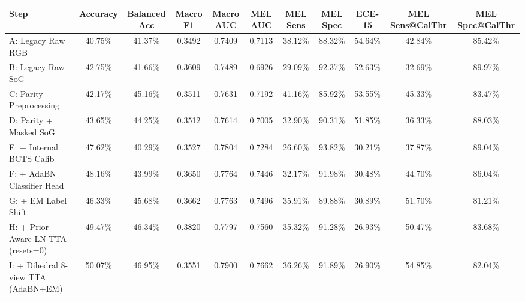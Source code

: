 \begin{tabular}{lcccccccccc}
\toprule
Step & Accuracy & Balanced Acc & Macro F1 & Macro AUC & MEL AUC & MEL Sens & MEL Spec & ECE-15 & MEL Sens@CalThr & MEL Spec@CalThr \\
\midrule
A: Legacy Raw RGB & 40.75\% & 41.37\% & 0.3492 & 0.7409 & 0.7113 & 38.12\% & 88.32\% & 54.64\% & 42.84\% & 85.42\% \\
B: Legacy Raw SoG & 42.75\% & 41.66\% & 0.3609 & 0.7489 & 0.6926 & 29.09\% & 92.37\% & 52.63\% & 32.69\% & 89.97\% \\
C: Parity Preprocessing & 42.17\% & 45.16\% & 0.3511 & 0.7631 & 0.7192 & 41.16\% & 85.92\% & 53.55\% & 45.33\% & 83.47\% \\
D: Parity + Masked SoG & 43.65\% & 44.25\% & 0.3512 & 0.7614 & 0.7005 & 32.90\% & 90.31\% & 51.85\% & 36.33\% & 88.03\% \\
E: + Internal BCTS Calib & 47.62\% & 40.29\% & 0.3527 & 0.7804 & 0.7284 & 26.60\% & 93.82\% & 30.21\% & 37.87\% & 89.04\% \\
F: + AdaBN Classifier Head & 48.16\% & 43.99\% & 0.3650 & 0.7764 & 0.7446 & 32.17\% & 91.98\% & 30.48\% & 44.70\% & 86.04\% \\
G: + EM Label Shift & 46.33\% & 45.68\% & 0.3662 & 0.7763 & 0.7496 & 35.91\% & 89.88\% & 30.89\% & 51.70\% & 81.21\% \\
H: + Prior-Aware LN-TTA (resets=0) & 49.47\% & 46.34\% & 0.3820 & 0.7797 & 0.7560 & 35.32\% & 91.28\% & 26.93\% & 50.47\% & 83.68\% \\
I: + Dihedral 8-view TTA (AdaBN+EM) & 50.07\% & 46.95\% & 0.3551 & 0.7900 & 0.7662 & 36.26\% & 91.89\% & 26.90\% & 54.85\% & 82.04\% \\
\bottomrule
\end{tabular}
